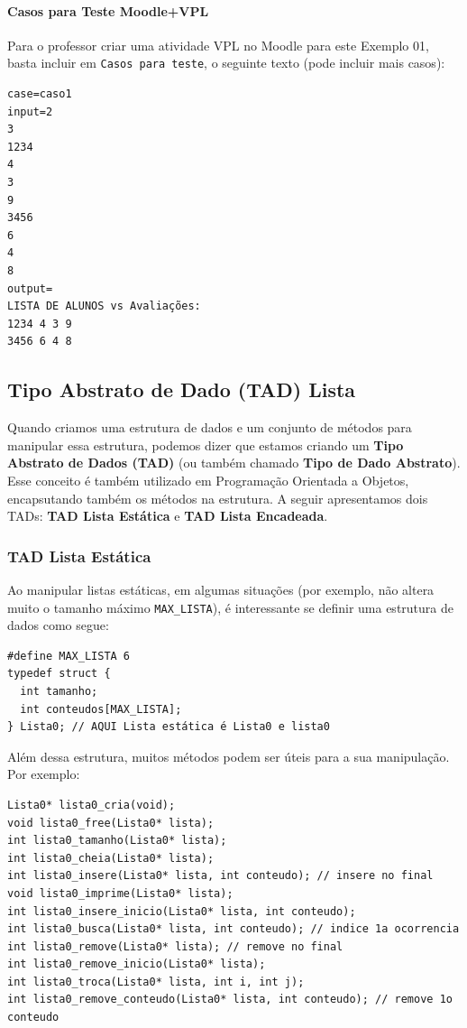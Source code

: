 \documentclass[12pt,a4paper]{article}
\begin{document}
    \hypertarget{casos-para-teste-moodlevpl}{%
\paragraph{Casos para Teste
Moodle+VPL}\label{casos-para-teste-moodlevpl}}

Para o professor criar uma atividade VPL no Moodle para este Exemplo 01,
basta incluir em \texttt{Casos\ para\ teste}, o seguinte texto (pode
incluir mais casos):

\begin{verbatim}
case=caso1
input=2
3
1234
4
3
9
3456
6
4
8
output=
LISTA DE ALUNOS vs Avaliações:
1234 4 3 9
3456 6 4 8
\end{verbatim}

    \hypertarget{tipo-abstrato-de-dado-tad-lista}{%
\subsection{Tipo Abstrato de Dado (TAD)
Lista}\label{tipo-abstrato-de-dado-tad-lista}}

    Quando criamos uma estrutura de dados e um conjunto de métodos para
manipular essa estrutura, podemos dizer que estamos criando um
\textbf{Tipo Abstrato de Dados (TAD)} (ou também chamado \textbf{Tipo de
Dado Abstrato}). Esse conceito é também utilizado em Programação
Orientada a Objetos, encapsutando também os métodos na estrutura. A
seguir apresentamos dois TADs: \textbf{TAD Lista Estática} e \textbf{TAD
Lista Encadeada}.

    \hypertarget{tad-lista-estuxe1tica}{%
\subsubsection{TAD Lista Estática}\label{tad-lista-estuxe1tica}}

    Ao manipular listas estáticas, em algumas situações (por exemplo, não
altera muito o tamanho máximo \texttt{MAX\_LISTA}), é interessante se
definir uma estrutura de dados como segue:

\begin{verbatim}
#define MAX_LISTA 6
typedef struct {
  int tamanho;
  int conteudos[MAX_LISTA];
} Lista0; // AQUI Lista estática é Lista0 e lista0
\end{verbatim}

Além dessa estrutura, muitos métodos podem ser úteis para a sua
manipulação. Por exemplo:

\begin{verbatim}
Lista0* lista0_cria(void);
void lista0_free(Lista0* lista);
int lista0_tamanho(Lista0* lista);
int lista0_cheia(Lista0* lista);
int lista0_insere(Lista0* lista, int conteudo); // insere no final
void lista0_imprime(Lista0* lista);
int lista0_insere_inicio(Lista0* lista, int conteudo);
int lista0_busca(Lista0* lista, int conteudo); // indice 1a ocorrencia
int lista0_remove(Lista0* lista); // remove no final
int lista0_remove_inicio(Lista0* lista);
int lista0_troca(Lista0* lista, int i, int j);
int lista0_remove_conteudo(Lista0* lista, int conteudo); // remove 1o conteudo
\end{verbatim}
\end{document}
